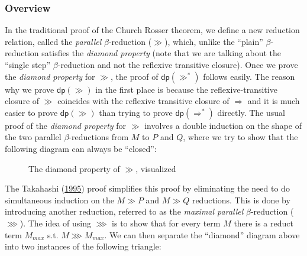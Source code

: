 \documentclass[a4paper, 12pt, twoside]{style/ociamthesis}
\theoremstyle{plain}
\theoremstyle{definition}
\theoremstyle{remark}
\newcommand{\dip}{\textsf{dp}}
\begin{document}
\subsubsection{Overview}\label{overview}

In the traditional proof of the Church Rosser theorem, we define a new
reduction relation, called the \emph{parallel} \(\beta\)-reduction
(\(\gg\)), which, unlike the ``plain'' \(\beta\)-reduction satisfies the
\emph{diamond property} (note that we are talking about the ``single
step'' \(\beta\)-reduction and not the reflexive transitive closure).
Once we prove the \emph{diamond property} for \(\gg\), the proof of
\(\dip(\gg^*)\) follows easily. The reason why we prove \(\dip(\gg)\) in
the first place is because the reflexive-transitive closure of \(\gg\)
coincides with the reflexive transitive closure of \(\Rightarrow\) and
it is much easier to prove \(\dip(\gg)\) than trying to prove
\(\dip(\Rightarrow^*)\) directly. The usual proof of the \emph{diamond
property} for \(\gg\) involves a double induction on the shape of the
two parallel \(\beta\)-reductions from \(M\) to \(P\) and \(Q\), where
we try to show that the following diagram can always be ``closed'':

\begin{figure}[h]
\begin{center}
\end{center}
\caption{The diamond property of $\gg$, visualized}
\end{figure}

The Takahashi (\protect\hyperlink{ref-takahashi95}{1995}) proof
simplifies this proof by eliminating the need to do simultaneous
induction on the \(M \gg P\) and \(M \gg Q\) reductions. This is done by
introducing another reduction, referred to as the \emph{maximal
parallel} \(\beta\)-reduction (\(\ggg\)). The idea of using \(\ggg\) is
to show that for every term \(M\) there is a reduct term \(M_{max}\)
s.t. \(M \ggg M_{max}\). We can then separate the ``diamond'' diagram
above into two instances of the following triangle:
\end{document}
